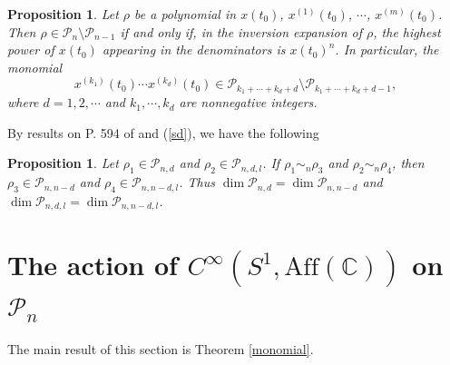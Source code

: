 \documentclass[11pt]{amsart}
\numberwithin{equation}{section}
\newcommand{\di}{\displaystyle}
\newtheorem{prop}[thm]{Proposition}
\newcommand{\scp}{\mathscr{P}}
\newcommand{\pn}{\mathscr{P}_{n}}
\newcommand{\pnd}{\mathscr{P}_{n, d}}
\newcommand{\pndl}{\mathscr{P}_{n, d, l}}
\newcommand{\aff}{\mathrm{Aff}(\mathbb{C})}
\begin{document}
\begin{prop} \label{monoj}
    Let $\rho$ be a polynomial in $x(t_0)$, $x^{(1)}(t_0)$, $\cdots$, $x^{(m)}(t_0)$.
    Then $\rho \in \scp_{n} \setminus \scp_{n-1}$ if and only if,
    in the inversion expansion of $\rho$, the highest power of $x(t_0)$  appearing in the denominators is $x(t_0)^{n}$.
    In particular, the monomial
    \begin{equation*}
  x^{(k_1)}(t_0) \cdots x^{(k_d)}(t_0) \in \scp_{k_1+\cdots+k_d+d} \setminus \scp_{k_1+\cdots+k_d+d-1},
    \end{equation*}
    where $d=1, 2, \cdots$ and $k_1, \cdots, k_d$ are nonnegative integers.
\end{prop}

By results on P. 594 of \cite{wz} and (\ref{sd}), we have  the following
\begin{prop} \label{pnd}
  Let $\rho_1 \in \pnd$ and $\rho_2 \in \pndl$. If $\rho_1 \sim_n \rho_3$ and $\rho_2 \sim_n \rho_4$,
  then $\rho_3 \in \scp_{n, n-d}$ and $\rho_4 \in \scp_{n, n-d, l}$. Thus $\di \dim \pnd=\dim \scp_{n, n-d}$
  and $\di \dim \pndl=\dim \scp_{n, n-d, l}$.
\end{prop}

\section{The action of $C^{\infty}(S^1, \aff)$ on $\pn$ \label{action}}

The main result of this section is Theorem \ref{monomial}.
\end{document}
